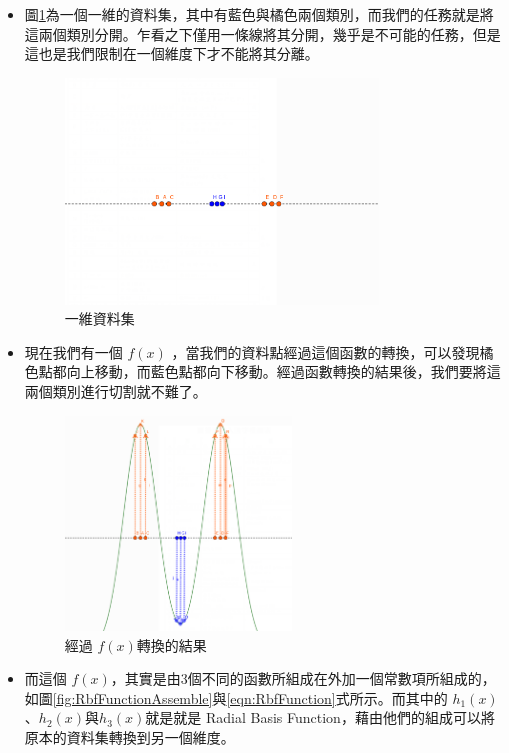 \begin{itemize}
	\item

	      圖\ref{fig:RbfIntroductionNotTransfer}為一個一維的資料集，其中有藍色與橘色兩個類別，而我們的任務就是將這兩個類別分開。乍看之下僅用一條線將其分開，幾乎是不可能的任務，但是這也是我們限制在一個維度下才不能將其分離。



	      \begin{figure}[h]
		      \centering
		      \includegraphics[height=6cm]{./pic/vM4xT9rm.png}
		      \caption{一維資料集}
		      \label{fig:RbfIntroductionNotTransfer}
	      \end{figure}

	\item
	      現在我們有一個 \(f(x)\) ，當我們的資料點經過這個函數的轉換，可以發現橘色點都向上移動，而藍色點都向下移動。經過函數轉換的結果後，我們要將這兩個類別進行切割就不難了。

	      \begin{figure}[h]
		      \centering
		      \includegraphics[width=6cm]{./pic/7VM3Lid5.png}
		      \caption{經過 \(f(x)\)轉換的結果 }
		      \label{fig:RbfWithFunction}
	      \end{figure}


	\item
	      而這個 \(f(x)\)，其實是由3個不同的函數所組成在外加一個常數項所組成的，如圖\ref{fig:RbfFunctionAssemble}與\ref{eqn:RbfFunction}式所示。而其中的 \(h_1(x)\)、\(h_2(x)\)與\(h_3(x)\)就是就是 Radial Basis Function，藉由他們的組成可以將原本的資料集轉換到另一個維度。


\end{itemize}
